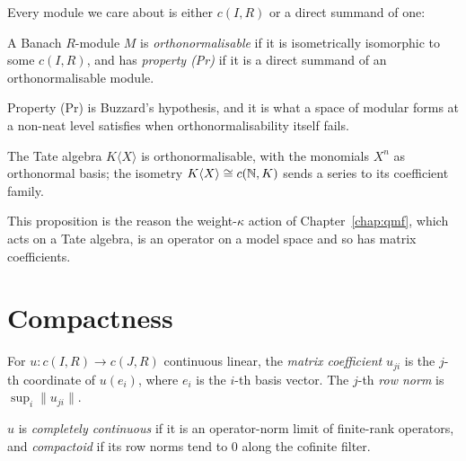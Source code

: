 Every module we care about is either $c(I,R)$ or a direct summand of one:

\begin{definition}
  \label{def:onable}
  \leanok
  A Banach $R$-module $M$ is \emph{orthonormalisable} if it is isometrically isomorphic to some
  $c(I,R)$, and has \emph{property (Pr)} if it is a direct summand of an orthonormalisable
  module.
\end{definition}

Property (Pr) is Buzzard's hypothesis, and it is what a space of modular forms at a non-neat
level satisfies when orthonormalisability itself fails.

\begin{proposition}
  \label{prop:tate-algebra-onable}
  \leanok
  The Tate algebra $K\langle X \rangle$ is orthonormalisable, with the monomials $X^n$ as
  orthonormal basis; the isometry $K\langle X\rangle \cong c(\mathbb{N}, K)$ sends a series to its
  coefficient family.
\end{proposition}

This proposition is the reason the weight-$\kappa$ action of Chapter~\ref{chap:qmf}, which acts
on a Tate algebra, is an operator on a model space and so has matrix coefficients.

\section{Compactness}

\begin{definition}
  \label{def:matrixcoeff}
  \leanok
  For $u : c(I,R) \to c(J,R)$ continuous linear, the \emph{matrix coefficient} $u_{j i}$ is the
  $j$-th coordinate of $u(e_i)$, where $e_i$ is the $i$-th basis vector.  The $j$-th
  \emph{row norm} is $\sup_i \lVert u_{ji}\rVert$.
\end{definition}

\begin{definition}
  \label{def:iscompactoid}
  \leanok
  $u$ is \emph{completely continuous} if it is an operator-norm limit of finite-rank operators,
  and \emph{compactoid} if its row norms tend to $0$ along the cofinite filter.
\end{definition}

